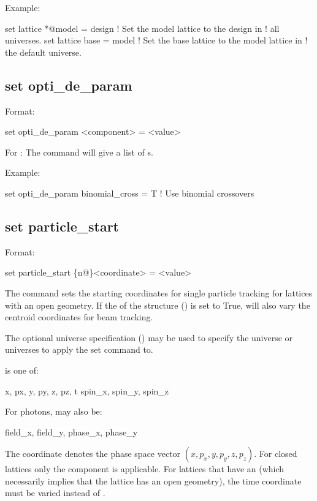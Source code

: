 {{Example:
\begin{example}
  set lattice *@model = design  ! Set the model lattice to the design in 
                                !   all universes.
  set lattice base = model      ! Set the base lattice to the model lattice in 
                                !   the default universe.
\end{example}


\subsection{set opti_de_param}
\label{s:set.opti.de.param}

Format:
\begin{example}
  set opti_de_param <component> = <value>
\end{example}

For : The  command will give a list of 
s.

Example:
\begin{example}
  set opti_de_param binomial_cross = T  ! Use binomial crossovers 
\end{example}


\subsection{set particle_start}
\label{s:set.particle.start}

Format:
\begin{example}
  set particle_start \{n@\}<coordinate> = <value>
\end{example}
The  command sets the starting coordinates for single particle tracking for
lattices with an open geometry. If the  of the 
structure () is set to True,  will also vary the centroid
coordinates for beam tracking.

The optional  universe specification () may be used to specify the universe
or universes to apply the set command to.

 is one of:
\begin{example}
  x, px, y, py, z, pz, t
  spin_x, spin_y, spin_z
\end{example}
For photons,  may also be:
\begin{example}
  field_x, field_y, phase_x, phase_y
\end{example}
The \vn{*} coordinate denotes the phase space vector $(x, p_x, y, p_y, z, p_z)$.  For closed
lattices only the  component is applicable. For lattices that have an  (which
necessarily implies that the lattice has an open geometry), the time  coordinate must be
varied instead of .

}}
